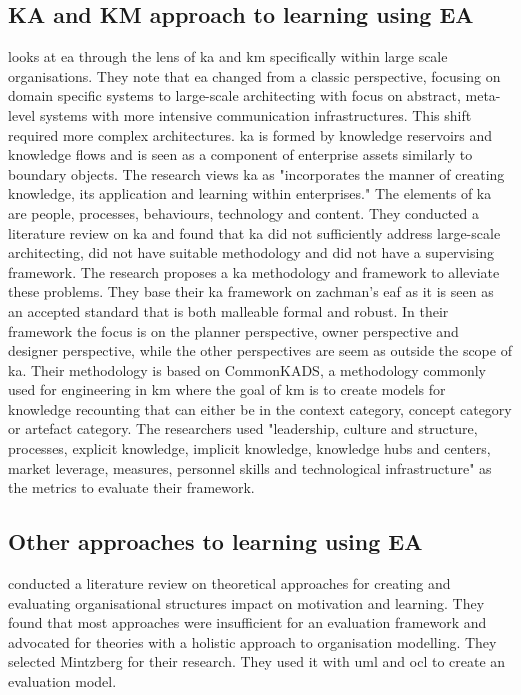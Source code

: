 \subsection{KA and KM approach to learning using EA}
\cite{10.1371/journal.pone.0127005} looks at \gls{ea} through the lens of \gls{ka} and \gls{km} specifically within large scale organisations. They note that \gls{ea} changed from a classic perspective, focusing on domain specific systems to large-scale architecting with focus on abstract, meta-level systems with more intensive communication infrastructures. This shift required more complex architectures. \gls{ka} is formed by knowledge reservoirs and knowledge flows and is seen as a component of enterprise assets similarly to \glspl{boundary object}. The research views \gls{ka} as "incorporates the manner of creating knowledge, its application and learning within enterprises."\cite[p.~4]{10.1371/journal.pone.0127005} The elements of \gls{ka} are people, processes, behaviours, technology and content. They conducted a literature review on \gls{ka} and found that \gls{ka} did not sufficiently address large-scale architecting, did not have suitable methodology and did not have a supervising framework. The research proposes a \gls{ka} methodology and framework to alleviate these problems. They base their \gls{ka} framework on zachman's \gls{eaf} as it is seen as an accepted standard that is both malleable formal and robust. In their framework the focus is on the planner perspective, owner perspective and designer perspective, while the other perspectives are seem as outside the scope of \gls{ka}. Their methodology is based on CommonKADS, a methodology commonly used for engineering in \gls{km} where the goal of \gls{km} is to create  models for knowledge recounting that can either be in the context category, concept category or artefact category. The researchers used "leadership, culture and structure, processes, explicit knowledge, implicit knowledge, knowledge hubs and centers, market leverage, measures, personnel skills and technological infrastructure"\cite[p.~17]{10.1371/journal.pone.0127005} as the metrics to evaluate their framework.

\subsection{Other approaches to learning using EA}
\cite{narman2016using} conducted a literature review on theoretical approaches for creating and evaluating organisational structures impact on motivation and learning. They found that most approaches were insufficient for an evaluation framework and advocated for theories with a holistic approach to organisation modelling. They selected Mintzberg \cite{mintzberg1979structuring} for their research. They used it with \gls{uml} and \gls{ocl} to create an evaluation model. 

